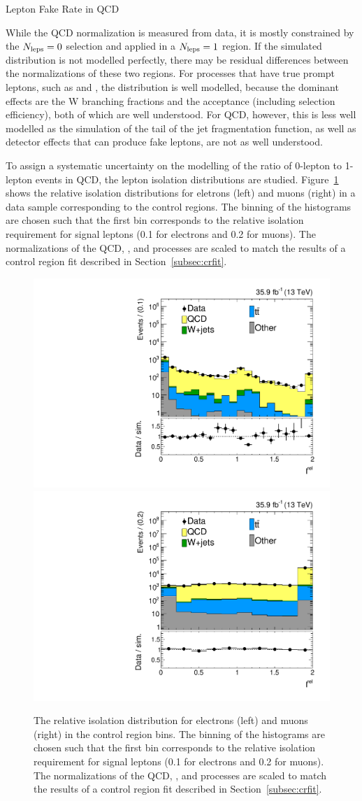 \begin{section}{Lepton Fake Rate in QCD}

While the QCD normalization is measured from data, it is mostly constrained by the $N_{\mathrm{leps}} = 0$ selection and applied in a $N_{\mathrm{leps}} = 1$ region.
If the simulated \Nleps distribution is not modelled perfectly, there may be residual differences between the normalizations of these two regions.
For processes that have true prompt leptons, such as \ttbar and \Wjets, the \Nleps distribution is well modelled, because the dominant effects are the W branching fractions and the acceptance (including selection efficiency), both of which are well understood. 
For QCD, however, this is less well modelled as the simulation of the tail of the jet fragmentation function, as well as detector effects that can produce fake leptons, are not as well understood.

To assign a systematic uncertainty on the modelling of the ratio of 0-lepton to 1-lepton events in QCD, the lepton isolation distributions are studied.
Figure~\ref{fig:lep_iso} shows the relative isolation distributions for eletrons (left) and muons (right) in a data sample corresponding to the control regions.
The binning of the histograms are chosen such that the first bin corresponds to the relative isolation requirement for signal leptons (0.1 for electrons and 0.2 for muons).
The normalizations of the QCD, \ttbar, and \Wjets processes are scaled to match the results of a control region fit described in Section~\ref{subsec:crfit}.

\begin{figure}[tbp!]
\begin{center}
\includegraphics[angle=0,width=0.45\columnwidth]{fig/iso_els.pdf}
\includegraphics[angle=0,width=0.45\columnwidth]{fig/iso_mus.pdf}
\end{center}
\caption{The relative isolation distribution for electrons (left) and muons (right) in the control region bins.
The binning of the histograms are chosen such that the first bin corresponds to the relative isolation requirement for signal leptons (0.1 for electrons and 0.2 for muons).
The normalizations of the QCD, \ttbar, and \Wjets processes are scaled to match the results of a control region fit described in Section~\ref{subsec:crfit}.}
\label{fig:lep_iso}
\end{figure}


\end{section}
